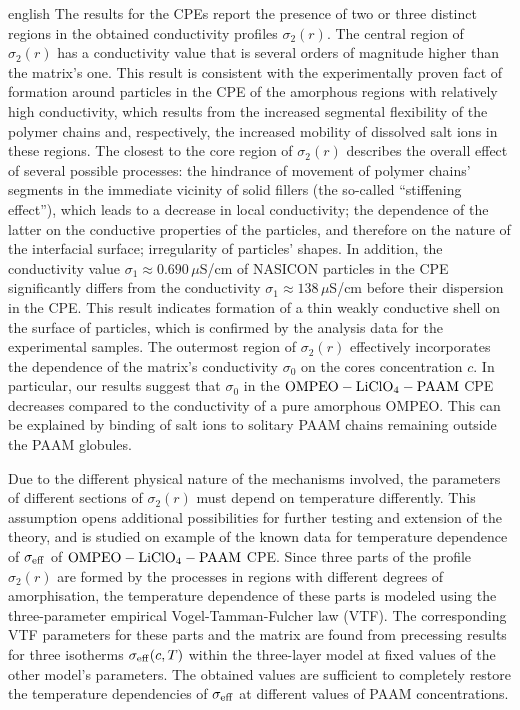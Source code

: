 \begin{otherlanguage*}{english}
The results for the CPEs report the presence of two or three distinct regions in the obtained conductivity profiles $ \sigma_2 (r) $.
The central region of $ \sigma_2 (r) $ has a conductivity value that is several orders of magnitude higher than the matrix's one. This result is consistent with the experimentally proven fact of formation around particles in the CPE of the amorphous regions with relatively high conductivity, which results from the increased segmental flexibility of the polymer chains and, respectively, the increased mobility of dissolved salt ions in these regions.
The closest to the core region of $ \sigma_2 (r) $ describes the overall effect of several possible processes: the hindrance of movement of polymer chains' segments in the immediate vicinity of solid fillers (the so-called ``stiffening effect''), which leads to a decrease in local conductivity; the dependence of the latter on the conductive properties of the particles, and therefore on the nature of the interfacial surface; irregularity of particles' shapes.
In addition, the conductivity value $ \sigma_1 \approx 0.690\,\mu$S/cm of NASICON particles in the CPE significantly differs from the conductivity $ \sigma_1 \approx 138\,\mu$S/cm before their dispersion in the CPE. This result indicates formation of a thin weakly conductive shell on the surface of particles, which is confirmed by the analysis data for the experimental samples.
The outermost region of $ \sigma_2 (r) $ effectively incorporates the dependence of the matrix's conductivity $ \sigma_0 $ on the cores concentration $ c $. In particular, our results suggest that $ \sigma_0 $ in the $ \rm OMPEO-LiClO_4-PAAM $ CPE decreases compared to the conductivity of a pure amorphous OMPEO. This can be explained by binding of salt ions to solitary PAAM chains remaining outside the PAAM globules.

Due to the different physical nature of the mechanisms involved, the parameters of different sections of $ \sigma_2 (r) $ must depend on temperature differently. This assumption opens additional possibilities for further testing and extension of the theory, and is studied on example of the known data for temperature dependence of $ \sigma _ {\rm eff} $ of $ \rm OMPEO-LiClO_4-PAAM $ CPE.
Since three parts of the profile $ \sigma_2 (r) $ are formed by the processes in regions with different degrees of amorphisation, the temperature dependence of these parts is modeled using the three-parameter empirical Vogel-Tamman-Fulcher law (VTF).
The corresponding VTF parameters for these parts and the matrix are found from precessing results for three isotherms $ \sigma _ {\rm eff} (c, T) $ within the three-layer model at fixed values of the other model's parameters.
The obtained values are sufficient to completely restore the temperature dependencies of $ \sigma _ {\rm eff} $ at different values of PAAM concentrations.


\end{otherlanguage*}
